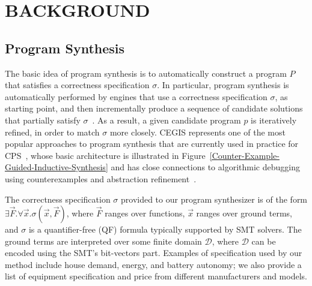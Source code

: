 \documentclass[runningheads]{llncs}
\begin{document}
\section{BACKGROUND}
\label{sec:AutomatedVerification}
%
\subsection{Program Synthesis}
\label{sec:ProgramSynthesis}
%
The basic idea of program synthesis is to automatically construct a program $P$ that satisfies a correctness specification $\sigma$. In particular, program synthesis is automatically performed by engines that use a correctness specification $\sigma$, as starting point, and then incrementally produce a sequence of candidate solutions that partially satisfy $\sigma$~\cite{Abateetal2017}. As a result, a given candidate program $p$ is iteratively refined, in order to match $\sigma$ more closely. CEGIS represents one of the most popular approaches to program synthesis that are currently used in practice for CPS~\cite{Abateetal2017}, whose basic architecture is illustrated in Figure~\ref{Counter-Example-Guided-Inductive-Synthesis} and has close connections to algorithmic debugging using counterexamples and abstraction refinement~\cite{Alur}. 

The correctness specification $\sigma$ provided to our program synthesizer is of the form $\exists \vec{F} .  \forall \vec{x}.  \sigma(\vec{x}, \vec{F})$, where $\vec{F}$ ranges over functions, $\vec{x}$ ranges over ground terms, and $\sigma$ is a quantifier-free (QF) formula typically supported by SMT solvers. The ground terms are interpreted over some finite domain $\mathcal{D}$, where $\mathcal{D}$ can be encoded using the SMT's bit-vectors part. Examples of specification used by our method include house demand, energy, and battery autonomy; we also provide a list of equipment specification and price from different manufacturers and models.
\end{document}
